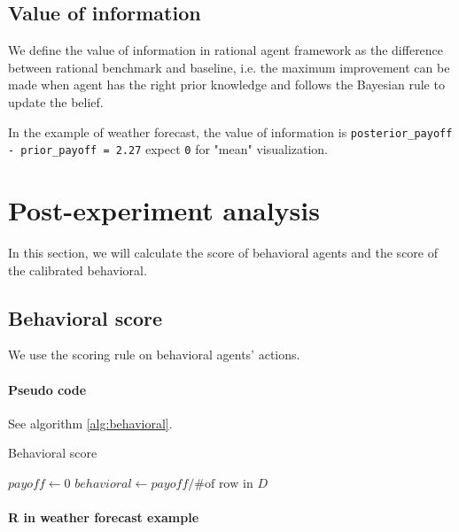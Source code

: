 \documentclass{article}
\begin{document}
\subsection{Value of information}

We define the value of information in rational agent framework as the difference between rational benchmark and baseline, i.e. the maximum improvement can be made when agent has the right prior knowledge and follows the Bayesian rule to update the belief.

In the example of weather forecast, the value of information is \texttt{posterior\_payoff - prior\_payoff = 2.27} expect \texttt{0} for "mean" visualization.

\section{Post-experiment analysis}

In this section, we will calculate the score of behavioral agents and the score of the calibrated behavioral.

\subsection{Behavioral score}

We use the scoring rule on behavioral agents' actions.

\paragraph{Pseudo code}
See algorithm \ref{alg:behavioral}.

\begin{algorithm}[!h]
\caption{Behavioral score}\label{alg:behavioral}
$payoff \gets 0$\;
$behavioral \gets payoff / \text{\# of row in }D$\;
\end{algorithm}

\paragraph{R in weather forecast example}
\end{document}
